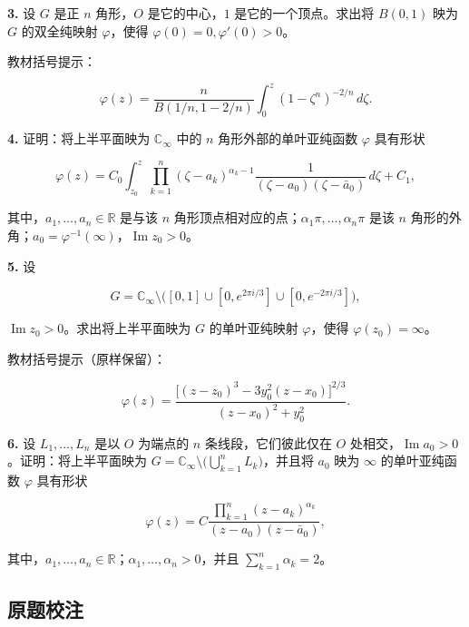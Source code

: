 \documentclass[11pt,a4paper]{article}
\begin{document}
\par{}
\noindent\textbf{3.} 设 \(G\) 是正 \(n\) 角形，\(O\) 是它的中心，\(1\)
是它的一个顶点。求出将 \(B(0,1)\) 映为 \(G\) 的双全纯映射
\(\varphi\)，使得 \(\varphi(0)=0,\varphi'(0)>0\)。

教材括号提示：

\[
\varphi(z)=\frac{n}{B(1/n,1-2/n)}\int_0^z(1-\zeta^n)^{-2/n}\,d\zeta.
\]

\par{}
\noindent\textbf{4.} 证明：将上半平面映为 \(\mathbb C_\infty\) 中的 \(n\)
角形外部的单叶亚纯函数 \(\varphi\) 具有形状

\[
\varphi(z)=C_0\int_{z_0}^z\prod_{k=1}^n(\zeta-a_k)^{\alpha_k-1}
\frac1{(\zeta-a_0)(\zeta-\bar a_0)}\,d\zeta+C_1,
\]

其中，\(a_1,\ldots,a_n\in\mathbb R\) 是与该 \(n\)
角形顶点相对应的点；\(\alpha_1\pi,\ldots,\alpha_n\pi\) 是该 \(n\)
角形的外角；\(a_0=\varphi^{-1}(\infty)\)，\(\operatorname{Im}z_0>0\)。

\par{}
\noindent\textbf{5.} 设

\[
G=\mathbb C_\infty\setminus\bigl([0,1]\cup[0,e^{2\pi i/3}]\cup[0,e^{-2\pi i/3}]\bigr),
\]

\(\operatorname{Im}z_0>0\)。求出将上半平面映为 \(G\) 的单叶亚纯映射
\(\varphi\)，使得 \(\varphi(z_0)=\infty\)。

教材括号提示（原样保留）：

\[
\varphi(z)=\frac{\bigl[(z-z_0)^3-3y_0^2(z-x_0)\bigr]^{2/3}}{(z-x_0)^2+y_0^2}.
\]

\par{}
\noindent\textbf{6.} 设 \(L_1,\ldots,L_n\) 是以 \(O\) 为端点的 \(n\)
条线段，它们彼此仅在 \(O\)
处相交，\(\operatorname{Im}a_0>0\)。证明：将上半平面映为
\(G=\mathbb C_\infty\setminus\bigl(\bigcup_{k=1}^nL_k\bigr)\)，并且将
\(a_0\) 映为 \(\infty\) 的单叶亚纯函数 \(\varphi\) 具有形状

\[
\varphi(z)=C\frac{\prod_{k=1}^n(z-a_k)^{\alpha_k}}{(z-a_0)(z-\bar a_0)},
\]

其中，\(a_1,\ldots,a_n\in\mathbb R\)；\(\alpha_1,\ldots,\alpha_n>0\)，并且
\(\sum_{k=1}^n\alpha_k=2\)。

\subsection{原题校注}\label{ch07-practice-heading-6}
\end{document}
